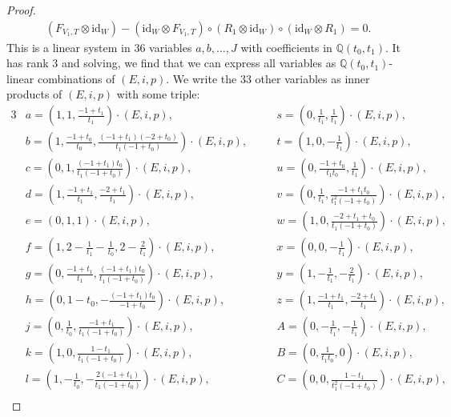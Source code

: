 \documentclass[pdftex]{sigma}
\numberwithin{equation}{section}
\theoremstyle{definition}
\begin{document}
\begin{proof}
\begin{gather*}
( F_{V_1,T} \otimes \text{id}_W) - (\text{id}_W \otimes F_{V_1,T})
\circ (R_1 \otimes \text{id}_W) \circ (\text{id}_W \otimes R_1) = 0 .
\end{gather*}
This is a linear system in $36$ variables $a,b,\dots,J$ with coefficients
in $\mathbb{Q}(t_0,t_1)$. It has rank $3$ and solving, we find that we can express
all variables as $\mathbb{Q}(t_0,t_1)$-linear combinations of $(E,i,p)$. We write the 33 other variables as inner products of $(E,i,p)$ with some triple:
\begin{alignat*}{3}
& a = \left( 1, 1, \frac{-1+t_1}{t_1} \right) \cdot (E,i,p) ,\qquad &&
s = \left(0, \frac{1}{t_1}, \frac{1}{t_1} \right) \cdot (E,i,p) ,&\\
&b = \left(1, \frac{-1+t_0}{t_0}, \frac{(-1+t_1)(-2+t_0)}{t_1(-1+t_0)}\right) \cdot (E,i,p) ,\quad &&
t = \left(1, 0, -\frac{1}{t_1}\right) \cdot (E,i,p) ,& \\
&c = \left(0, 1, \frac{(-1+t_1)t_0}{t_1(-1+t_0)}\right) \cdot (E,i,p) ,\qquad &&
u = \left(0, \frac{-1+t_0}{t_1 t_0}, \frac{1}{t_1}\right) \cdot (E,i,p) ,&\\
&d = \left(1, \frac{-1+t_1}{t_1}, \frac{-2+t_1}{t_1}\right) \cdot (E,i,p) ,\qquad &&
v = \left(0, \frac{1}{t_1}, \frac{-1+t_1 t_0}{t_1^2(-1+t_0)}\right) \cdot (E,i,p) ,&\\
&e = ( 0, 1, 1 ) \cdot (E,i,p) ,\qquad &&
w = \left(1, 0, \frac{-2+t_1+t_0}{t_1(-1+t_0)} \right) \cdot (E,i,p) ,&\\
&f = \left(1, 2 - \frac{1}{t_1} - \frac{1}{t_0}, 2 - \frac{2}{t_1} \right) \cdot (E,i,p) ,\qquad &&
x = \left(0, 0, -\frac{1}{t_1}\right) \cdot (E,i,p) ,&\\
&g = \left(0, \frac{-1+t_1}{t_1}, \frac{(-1+t_1)t_0}{t_1(-1+t_0)}\right) \cdot (E,i,p) ,\qquad &&
y = \left(1, -\frac{1}{t_1}, -\frac{2}{t_1}\right) \cdot (E,i,p) ,&\\
&h = \left(0, 1-t_0, -\frac{(-1+t_1)t_0}{-1+t_0}\right) \cdot (E,i,p) ,\qquad &&
z = \left(1, \frac{-1+t_1}{t_1}, \frac{-2+t_1}{t_1} \right) \cdot (E,i,p) ,& \\
&j = \left(0, \frac{1}{t_0}, \frac{-1+t_1}{t_1(-1+t_0)}\right) \cdot (E,i,p) ,\qquad &&
A = \left(0, -\frac{1}{t_1}, -\frac{1}{t_1}\right) \cdot (E,i,p) ,&\\
&k = \left(1, 0, \frac{1-t_1}{t_1(-1+t_0)} \right) \cdot (E,i,p) ,\qquad &&
B = \left(0, \frac{1}{t_1 t_0}, 0\right) \cdot (E,i,p) ,&\\
&l = \left(1, -\frac{1}{t_0}, -\frac{2(-1+t_1)}{t_1(-1+t_0)} \right) \cdot (E,i,p) ,\qquad &&
C = \left(0, 0, \frac{1-t_1}{t_1^2(-1+t_0)}\right) \cdot (E,i,p) ,& \\

\end{alignat*}
\end{proof}
\end{document}
